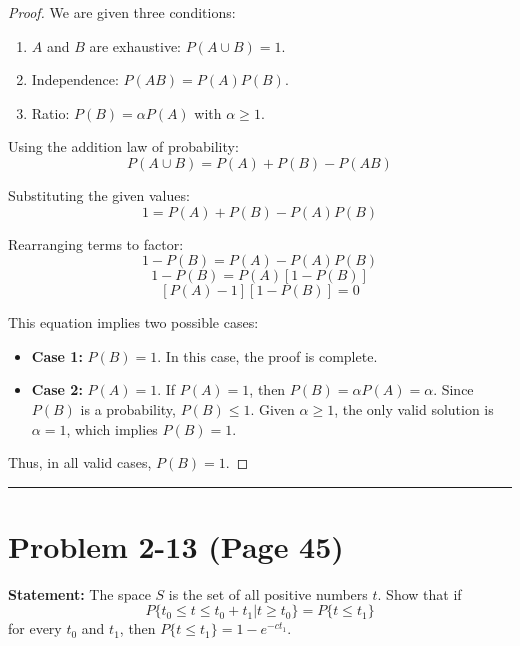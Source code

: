 \documentclass{article}
\begin{document}
\begin{proof}
	We are given three conditions:
	\begin{enumerate}
		\item $A$ and $B$ are exhaustive: $P(A \cup B) = 1$.
		\item Independence: $P(AB) = P(A)P(B)$.
		\item Ratio: $P(B) = \alpha P(A)$ with $\alpha \ge 1$.
	\end{enumerate}

	Using the addition law of probability:
	\[ P(A \cup B) = P(A) + P(B) - P(AB) \]

	Substituting the given values:
	\[ 1 = P(A) + P(B) - P(A)P(B) \]

	Rearranging terms to factor:
	\[ 1 - P(B) = P(A) - P(A)P(B) \]
	\[ 1 - P(B) = P(A) [1 - P(B)] \]
	\[ [P(A) - 1][1 - P(B)] = 0 \]

	This equation implies two possible cases:
	\begin{itemize}
		\item \textbf{Case 1:} $P(B) = 1$. In this case, the proof is complete.
		\item \textbf{Case 2:} $P(A) = 1$. If $P(A) = 1$, then $P(B) = \alpha P(A) = \alpha$. Since $P(B)$ is a probability, $P(B) \le 1$. Given $\alpha \ge 1$, the only valid solution is $\alpha = 1$, which implies $P(B) = 1$.
	\end{itemize}

	Thus, in all valid cases, $P(B) = 1$.
\end{proof}

\vspace{1cm}
\hrule
\vspace{1cm}

\section*{Problem 2-13 (Page 45)}
\textbf{Statement:} The space $S$ is the set of all positive numbers $t$. Show that if
\[ P\{t_0 \le t \le t_0 + t_1 | t \ge t_0\} = P\{t \le t_1\} \]
for every $t_0$ and $t_1$, then $P\{t \le t_1\} = 1 - e^{-ct_1}$.
\end{document}
